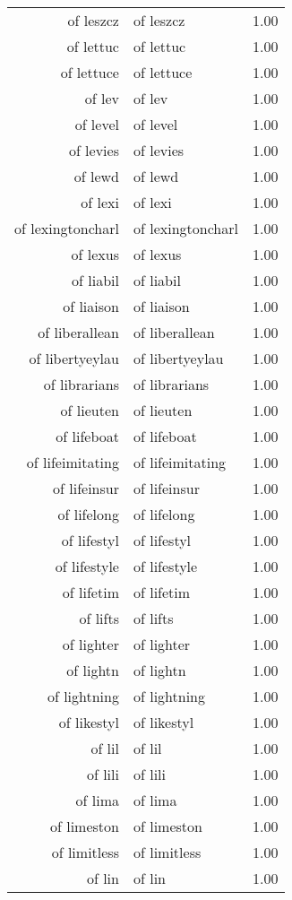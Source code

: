 \begin{table}[ht]
\begin{tabular}{rlr}
  of leszcz & of leszcz & 1.00 \\ 
  of lettuc & of lettuc & 1.00 \\ 
  of lettuce & of lettuce & 1.00 \\ 
  of lev & of lev & 1.00 \\ 
  of level & of level & 1.00 \\ 
  of levies & of levies & 1.00 \\ 
  of lewd & of lewd & 1.00 \\ 
  of lexi & of lexi & 1.00 \\ 
  of lexingtoncharl & of lexingtoncharl & 1.00 \\ 
  of lexus & of lexus & 1.00 \\ 
  of liabil & of liabil & 1.00 \\ 
  of liaison & of liaison & 1.00 \\ 
  of liberallean & of liberallean & 1.00 \\ 
  of libertyeylau & of libertyeylau & 1.00 \\ 
  of librarians & of librarians & 1.00 \\ 
  of lieuten & of lieuten & 1.00 \\ 
  of lifeboat & of lifeboat & 1.00 \\ 
  of lifeimitating & of lifeimitating & 1.00 \\ 
  of lifeinsur & of lifeinsur & 1.00 \\ 
  of lifelong & of lifelong & 1.00 \\ 
  of lifestyl & of lifestyl & 1.00 \\ 
  of lifestyle & of lifestyle & 1.00 \\ 
  of lifetim & of lifetim & 1.00 \\ 
  of lifts & of lifts & 1.00 \\ 
  of lighter & of lighter & 1.00 \\ 
  of lightn & of lightn & 1.00 \\ 
  of lightning & of lightning & 1.00 \\ 
  of likestyl & of likestyl & 1.00 \\ 
  of lil & of lil & 1.00 \\ 
  of lili & of lili & 1.00 \\ 
  of lima & of lima & 1.00 \\ 
  of limeston & of limeston & 1.00 \\ 
  of limitless & of limitless & 1.00 \\ 
  of lin & of lin & 1.00 \\ 

\end{tabular}
\end{table}
